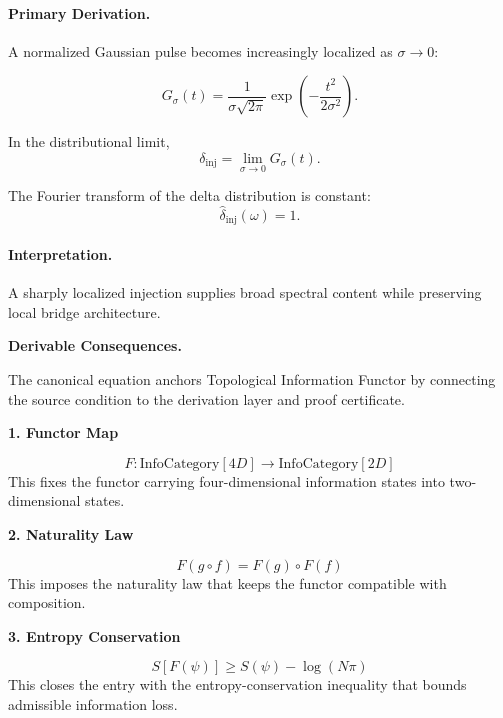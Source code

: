\paragraph{Primary Derivation.}
A normalized Gaussian pulse becomes increasingly localized as $\sigma\to0$:

\begin{equation}
G_{\sigma}(t)
=
\frac{1}{\sigma\sqrt{2\pi}}
\exp\left(
-\frac{t^2}{2\sigma^2}
\right).
\end{equation}

In the distributional limit,
\begin{equation}
\delta_{\mathrm{inj}}
=
\lim_{\sigma\to0}G_{\sigma}(t).
\end{equation}

The Fourier transform of the delta distribution is constant:
\begin{equation}
\boxed{
\widehat{\delta}_{\mathrm{inj}}(\omega)=1.
}
\end{equation}

\paragraph{Interpretation.}
A sharply localized injection supplies broad spectral content while preserving local bridge architecture.

\par\vspace{0.35em}
\noindent\textbf{Derivable Consequences.}\quad
\begingroup
\footnotesize
\raggedright
The canonical equation anchors Topological Information Functor by connecting the source condition to the derivation layer and proof certificate.
\par\endgroup

\noindent\textbf{1. Functor Map}\par
\[
F:\mathrm{InfoCategory}[4D]\longrightarrow \mathrm{InfoCategory}[2D]
\]
\noindent This fixes the functor carrying four-dimensional information states into two-dimensional states.\par
\noindent\textbf{2. Naturality Law}\par
\[
F(g\circ f)=F(g)\circ F(f)
\]
\noindent This imposes the naturality law that keeps the functor compatible with composition.\par
\noindent\textbf{3. Entropy Conservation}\par
\[
S[F(\psi)]\geq S(\psi)-\log(N\pi)
\]
\noindent This closes the entry with the entropy-conservation inequality that bounds admissible information loss.\par

